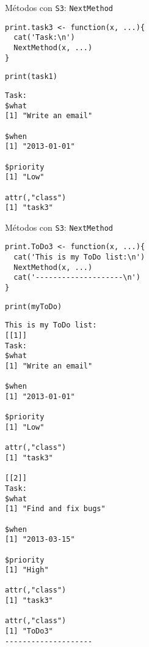 \documentclass[xcolor={usenames,svgnames,dvipsnames}]{beamer}
\begin{document}
\begin{frame}[fragile,label=sec-2-2-1]{Métodos con \texttt{S3}: \texttt{NextMethod}}
 \lstset{language=R,numbers=none}
\begin{lstlisting}
print.task3 <- function(x, ...){
  cat('Task:\n')
  NextMethod(x, ...)
}
\end{lstlisting}

\lstset{language=R,numbers=none}
\begin{lstlisting}
print(task1)
\end{lstlisting}

\begin{verbatim}
Task:
$what
[1] "Write an email"

$when
[1] "2013-01-01"

$priority
[1] "Low"

attr(,"class")
[1] "task3"
\end{verbatim}
\end{frame}
\begin{frame}[fragile,label=sec-2-2-2]{Métodos con \texttt{S3}: \texttt{NextMethod}}
 \lstset{language=R,numbers=none}
\begin{lstlisting}
print.ToDo3 <- function(x, ...){
  cat('This is my ToDo list:\n')
  NextMethod(x, ...)
  cat('--------------------\n')
}
\end{lstlisting}

\lstset{language=R,numbers=none}
\begin{lstlisting}
print(myToDo)
\end{lstlisting}

\begin{verbatim}
This is my ToDo list:
[[1]]
Task:
$what
[1] "Write an email"

$when
[1] "2013-01-01"

$priority
[1] "Low"

attr(,"class")
[1] "task3"

[[2]]
Task:
$what
[1] "Find and fix bugs"

$when
[1] "2013-03-15"

$priority
[1] "High"

attr(,"class")
[1] "task3"

attr(,"class")
[1] "ToDo3"
--------------------
\end{verbatim}
\end{frame}
\end{document}
